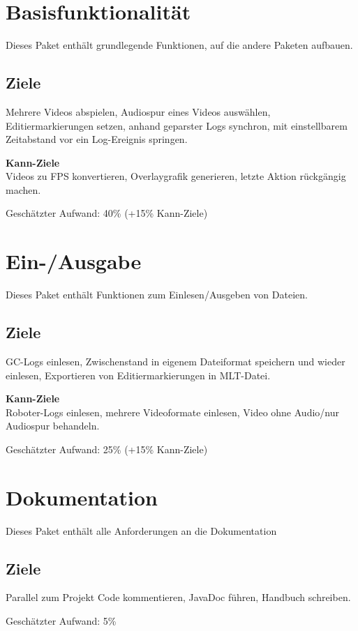 \section{Basisfunktionalität}
Dieses Paket enthält grundlegende Funktionen, auf die andere Paketen aufbauen.
\subsection{Ziele}
Mehrere Videos abspielen, Audiospur eines Videos auswählen, Editiermarkierungen setzen, anhand geparster Logs synchron, mit einstellbarem Zeitabstand vor ein Log-Ereignis springen.

\textbf{Kann-Ziele}\\
Videos zu FPS konvertieren, Overlaygrafik generieren, letzte Aktion rückgängig machen.

Geschätzter Aufwand: 40\% (+15\% Kann-Ziele)

\section{Ein-/Ausgabe}
Dieses Paket enthält Funktionen zum Einlesen/Ausgeben von Dateien.
\subsection{Ziele}
GC-Logs einlesen, Zwischenstand in eigenem Dateiformat speichern und wieder einlesen, Exportieren von Editiermarkierungen in MLT-Datei.

\textbf{Kann-Ziele}\\
Roboter-Logs einlesen, mehrere Videoformate einlesen, Video ohne Audio/nur Audiospur behandeln.

Geschätzter Aufwand: 25\% (+15\% Kann-Ziele)

\section{Dokumentation}
Dieses Paket enthält alle Anforderungen an die Dokumentation
\subsection{Ziele}
Parallel zum Projekt Code kommentieren, JavaDoc führen, Handbuch schreiben.

Geschätzter Aufwand: 5\%
